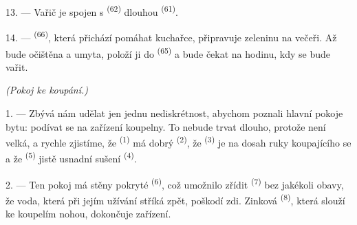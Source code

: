 13. --- Vařič je spojen s  \textsuperscript{(62)} dlouhou
 \textsuperscript{(61)}.

14. ---  \textsuperscript{(66)}, která přichází pomáhat kuchařce,
připravuje zeleninu na večeři. Až bude očištěna a umyta, položí ji do 
\textsuperscript{(65)} a bude čekat na hodinu, kdy se bude vařit.

\VUsaut{4.0mm}
{\centering\fontsize{10.2pt}{10.2pt}\selectfont{} \textit{(Pokoj ke koupání.)}\par}
\VUsaut{3.0mm}

1. --- Zbývá nám udělat jen jednu nediskrétnost, abychom poznali hlavní pokoje bytu: podívat
se na zařízení koupelny. To nebude trvat dlouho, protože není velká, a rychle zjistíme, že
 \textsuperscript{(1)} má dobrý  \textsuperscript{(2)}, že
 \textsuperscript{(3)} je na dosah ruky koupajícího se a že
 \textsuperscript{(5)} jistě usnadní sušení 
\textsuperscript{(4)}.

2. --- Ten pokoj má stěny pokryté  \textsuperscript{(6)}, což umožnilo zřídit
 \textsuperscript{(7)} bez jakékoli obavy, že voda, která při jejím užívání
stříká zpět, poškodí zdi. Zinková  \textsuperscript{(8)}, která slouží ke
koupelím nohou, dokončuje zařízení.
\VUsaut{6.0mm}
\VUfilet{22mm}
